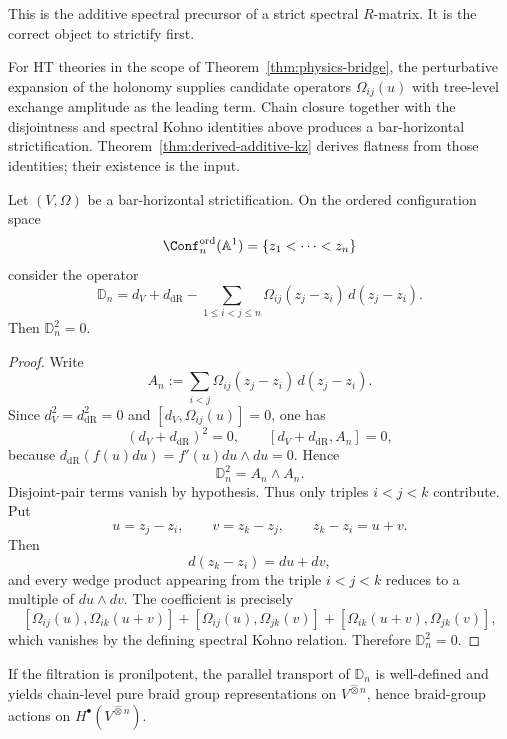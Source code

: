 This is the additive spectral precursor of a strict spectral
$R$-matrix. It is the correct object to strictify first.

\begin{remark}
\label{rem:bar-horizontal-existence}
For HT theories in the scope of Theorem~\ref{thm:physics-bridge}, the
perturbative expansion of the holonomy supplies candidate operators
$\Omega_{ij}(u)$ with tree-level exchange amplitude as the leading
term. Chain closure together with the disjointness and spectral Kohno
identities above produces a bar-horizontal strictification.
Theorem~\ref{thm:derived-additive-kz} derives flatness from those
identities; their existence is the input.
\end{remark}

\begin{theorem}
\label{thm:derived-additive-kz}
Let $(V,\Omega)$ be a bar-horizontal strictification. On the ordered
configuration space
\[
\Conf_n^{\mathrm{ord}}(\mathbb A^1)=\{z_1<\cdots<z_n\}
\]
consider the operator
\[
\mathbb D_n
=
 d_V+d_{\mathrm{dR}}
 - \sum_{1\le i<j\le n}\Omega_{ij}(z_j-z_i)\,d(z_j-z_i).
\]
Then $\mathbb D_n^2=0$.
\end{theorem}

\begin{proof}
Write
\[
A_n:=\sum_{i<j}\Omega_{ij}(z_j-z_i)\,d(z_j-z_i).
\]
Since $d_V^2=d_{\mathrm{dR}}^2=0$ and $[d_V,\Omega_{ij}(u)]=0$, one has
\[
(d_V+d_{\mathrm{dR}})^2=0,
\qquad
[d_V+d_{\mathrm{dR}},A_n]=0,
\]
because $d_{\mathrm{dR}}(f(u)du)=f'(u)du\wedge du=0$.
Hence
\[
\mathbb D_n^2=A_n\wedge A_n.
\]
Disjoint-pair terms vanish by hypothesis. Thus only triples
$i<j<k$ contribute. Put
\[
u=z_j-z_i,
\qquad
v=z_k-z_j,
\qquad
z_k-z_i=u+v.
\]
Then
\[
d(z_k-z_i)=du+dv,
\]
and every wedge product appearing from the triple $i<j<k$ reduces to a
multiple of $du\wedge dv$. The coefficient is precisely
\[
[\Omega_{ij}(u),\Omega_{ik}(u+v)]
+[\Omega_{ij}(u),\Omega_{jk}(v)]
+[\Omega_{ik}(u+v),\Omega_{jk}(v)],
\]
which vanishes by the defining spectral Kohno relation. Therefore
$\mathbb D_n^2=0$.
\end{proof}

\begin{corollary}
If the filtration is pronilpotent, the parallel transport of
$\mathbb D_n$ is well-defined and yields chain-level pure braid group
representations on $V^{\widehat\otimes n}$, hence braid-group actions
on $H^\bullet(V^{\widehat\otimes n})$.
\end{corollary}

